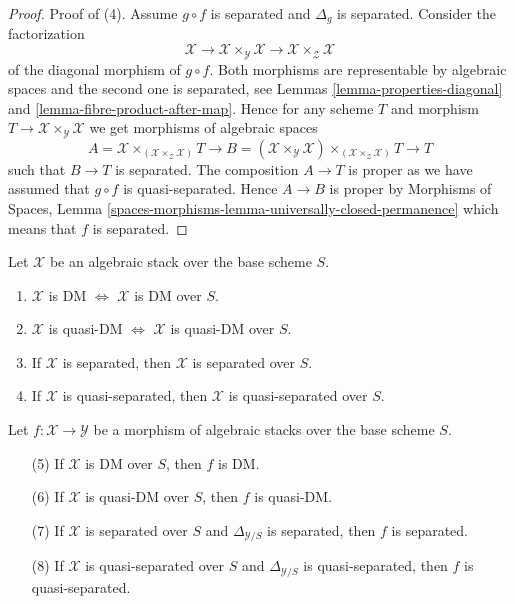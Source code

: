 \begin{proof}
\medskip\noindent
Proof of (4). Assume $g \circ f$ is separated and $\Delta_g$ is
separated. Consider the factorization
$$
\mathcal{X} \to
\mathcal{X} \times_\mathcal{Y} \mathcal{X} \to
\mathcal{X} \times_\mathcal{Z} \mathcal{X}
$$
of the diagonal morphism of $g \circ f$. Both morphisms are
representable by algebraic spaces and the second one is separated, see
Lemmas \ref{lemma-properties-diagonal} and
\ref{lemma-fibre-product-after-map}.
Hence for any scheme $T$ and morphism
$T \to \mathcal{X} \times_\mathcal{Y} \mathcal{X}$
we get morphisms of algebraic spaces
$$
A = \mathcal{X} \times_{(\mathcal{X} \times_\mathcal{Z} \mathcal{X})} T
\longrightarrow
B = (\mathcal{X} \times_\mathcal{Y} \mathcal{X})
\times_{(\mathcal{X} \times_\mathcal{Z} \mathcal{X})} T
\longrightarrow
T
$$
such that $B \to T$ is separated.
The composition $A \to T$ is proper as we have assumed that
$g \circ f$ is quasi-separated. Hence $A \to B$ is proper by
Morphisms of Spaces,
Lemma \ref{spaces-morphisms-lemma-universally-closed-permanence}
which means that $f$ is separated.
\end{proof}

\begin{lemma}
\label{lemma-separated-implies-morphism-separated}
Let $\mathcal{X}$ be an algebraic stack over the base scheme $S$.
\begin{enumerate}
\item
$\mathcal{X}$ is DM $\Leftrightarrow$
$\mathcal{X}$ is DM over $S$.
\item
$\mathcal{X}$ is quasi-DM $\Leftrightarrow$
$\mathcal{X}$ is quasi-DM over $S$.
\item If $\mathcal{X}$ is separated, then
$\mathcal{X}$ is separated over $S$.
\item If $\mathcal{X}$ is quasi-separated, then
$\mathcal{X}$ is quasi-separated over $S$.
\end{enumerate}
Let $f : \mathcal{X} \to \mathcal{Y}$ be a morphism of algebraic stacks
over the base scheme $S$.
\begin{enumerate}
\item[(5)] If $\mathcal{X}$ is DM over $S$, then $f$ is DM.
\item[(6)] If $\mathcal{X}$ is quasi-DM over $S$, then $f$ is quasi-DM.
\item[(7)] If $\mathcal{X}$ is separated over $S$ and
$\Delta_{\mathcal{Y}/S}$ is separated, then $f$ is separated.
\item[(8)] If $\mathcal{X}$ is quasi-separated over $S$ and
$\Delta_{\mathcal{Y}/S}$ is quasi-separated, then $f$ is quasi-separated.
\end{enumerate}
\end{lemma}

